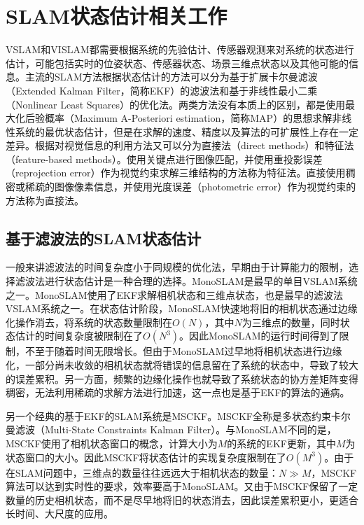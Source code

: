 \section{SLAM状态估计相关工作}

VSLAM和VISLAM都需要根据系统的先验估计、传感器观测来对系统的状态进行估计，可能包括实时的位姿状态、传感器状态、场景三维点状态以及其他可能的信息。主流的SLAM方法根据状态估计的方法可以分为基于扩展卡尔曼滤波（Extended Kalman Filter，简称EKF）的滤波法和基于非线性最小二乘（Nonlinear Least Squares）的优化法。两类方法没有本质上的区别，都是使用最大化后验概率（Maximum A-Posteriori estimation，简称MAP）的思想求解非线性系统的最优状态估计，但是在求解的速度、精度以及算法的可扩展性上存在一定差异。根据对视觉信息的利用方法又可以分为直接法（direct methods）和特征法（feature-based methods）。使用关键点进行图像匹配，并使用重投影误差（reprojection error）作为视觉约束求解三维结构的方法称为特征法。直接使用稠密或稀疏的图像像素信息，并使用光度误差（photometric error）作为视觉约束的方法称为直接法。

\subsection{基于滤波法的SLAM状态估计}

一般来讲滤波法的时间复杂度小于同规模的优化法，早期由于计算能力的限制，选择滤波法进行状态估计是一种合理的选择。MonoSLAM\citep{davison2007monoslam}是最早的单目VSLAM系统之一。MonoSLAM使用了EKF求解相机状态和三维点状态，也是最早的滤波法VSLAM系统之一。在状态估计阶段，MonoSLAM快速地将旧的相机状态通过边缘化操作消去，将系统的状态数量限制在$O(N)$，其中$N$为三维点的数量，同时状态估计的时间复杂度被限制在了$O(N^3)$。因此MonoSLAM的运行时间得到了限制，不至于随着时间无限增长。但由于MonoSLAM过早地将相机状态进行边缘化，一部分尚未收敛的相机状态就将错误的信息留在了系统的状态中，导致了较大的误差累积。另一方面，频繁的边缘化操作也就导致了系统状态的协方差矩阵变得稠密，无法利用稀疏的求解方法进行加速，这一点也是基于EKF的算法的通病。

另一个经典的基于EKF的SLAM系统是MSCKF\citep{mourikis2007multi}。MSCKF全称是多状态约束卡尔曼滤波（Multi-State Constraints Kalman Filter）。与MonoSLAM不同的是，MSCKF使用了相机状态窗口的概念，计算大小为$M$的系统的EKF更新，其中$M$为状态窗口的大小。因此MSCKF将状态估计的实现复杂度限制在了$O(M^3)$。由于在SLAM问题中，三维点的数量往往远远大于相机状态的数量：$N \gg M$，MSCKF算法可以达到实时性的要求，效率要高于MonoSLAM。又由于MSCKF保留了一定数量的历史相机状态，而不是尽早地将旧的状态消去，因此误差累积更小，更适合长时间、大尺度的应用。

